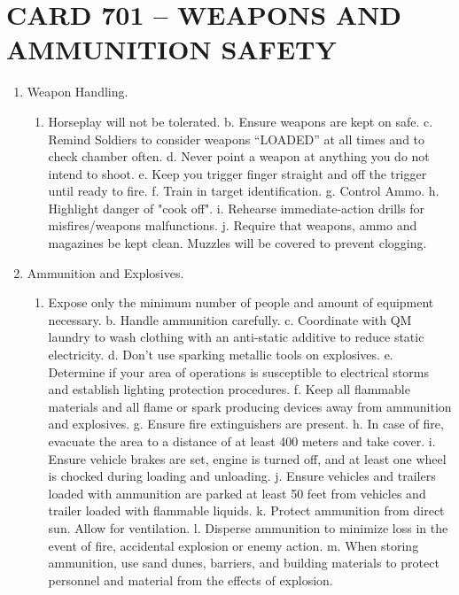 \documentclass{article}
\begin{document}
\section*{CARD 701 – WEAPONS AND AMMUNITION SAFETY}
\begin{enumerate}
    \item 	Weapon Handling.
    \begin{enumerate}
        \item 	Horseplay will not be tolerated.
b.	Ensure weapons are kept on safe.
c.	Remind Soldiers to consider weapons “LOADED” at all times and to check chamber often.
d.   Never point a weapon at anything you do not intend to shoot.
e.   Keep you trigger finger straight and off the trigger until ready to fire.
f.	Train in target identification.
g.	Control Ammo.
h.	Highlight danger of "cook off".
i.	Rehearse immediate-action drills for misfires/weapons malfunctions.
j.	Require that weapons, ammo and magazines be kept clean.  Muzzles will be covered to prevent clogging.
\end{enumerate}
\item	Ammunition and Explosives.
\begin{enumerate}
    \item Expose only the minimum number of people and amount of equipment necessary.
b.	Handle ammunition carefully.
c.	Coordinate with QM laundry to wash clothing with an anti-static additive to reduce static electricity.
d.	Don't use sparking metallic tools on explosives.
e.	Determine if your area of operations is susceptible to electrical storms and establish lighting protection procedures.
f. 	Keep all flammable materials and all flame or spark producing devices away from ammunition and explosives.
g.	Ensure fire extinguishers are present.
h.	In case of fire, evacuate the area to a distance of at least 400 meters and take cover.
i.	Ensure vehicle brakes are set, engine is turned off, and at least one wheel is chocked during loading and unloading.
j.	Ensure vehicles and trailers loaded with ammunition are parked at least 50 feet from vehicles and trailer loaded with flammable liquids.
k.	Protect ammunition from direct sun.  Allow for ventilation.
l.	Disperse ammunition to minimize loss in the event of fire, accidental explosion or enemy action.
m.	When storing ammunition, use sand dunes, barriers, and building materials to protect personnel and material from the effects of explosion.
\end{enumerate}
\end{enumerate}
\end{document}
